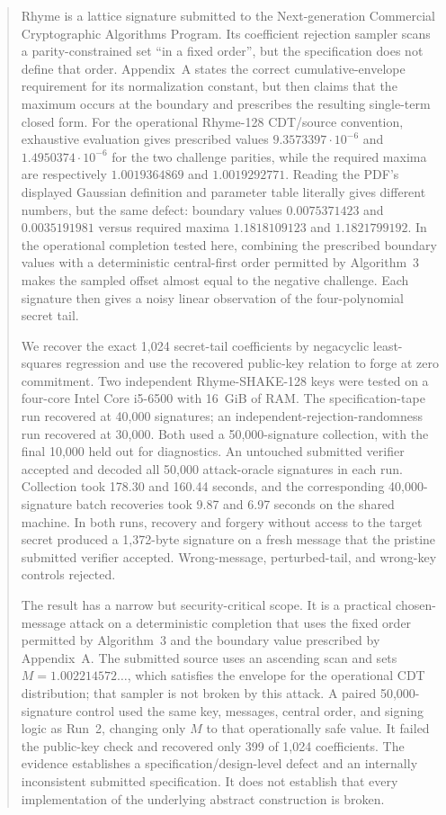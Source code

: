 \documentclass[11pt,a4paper]{article}
\begin{document}
\begin{abstract}
Rhyme is a lattice signature submitted to the Next-generation Commercial
Cryptographic Algorithms Program.  Its coefficient rejection sampler scans a
parity-constrained set ``in a fixed order'', but the specification does not
define that order.  Appendix~A states the correct cumulative-envelope
requirement for its normalization constant, but then claims that the maximum
occurs at the boundary and prescribes the resulting single-term closed form.
For the operational Rhyme-128 CDT/source convention, exhaustive evaluation
gives prescribed values $9.3573397\cdot10^{-6}$ and
$1.4950374\cdot10^{-6}$ for the two
challenge parities, while the required maxima are respectively
$1.0019364869$ and $1.0019292771$.  Reading the PDF's displayed Gaussian
definition and parameter table literally gives different numbers, but the
same defect: boundary values $0.0075371423$ and $0.0035191981$ versus required
maxima $1.1818109123$ and $1.1821799192$.  In the operational completion
tested here, combining the prescribed boundary values with a deterministic
central-first order permitted by Algorithm~3 makes the sampled offset almost
equal to the negative challenge.  Each signature then gives a noisy linear
observation of the four-polynomial secret tail.

We recover the exact 1,024 secret-tail coefficients by negacyclic
least-squares regression and use the recovered public-key relation to forge at
zero commitment.  Two independent Rhyme-SHAKE-128 keys were tested on a
four-core Intel Core i5-6500 with 16~GiB of RAM.  The specification-tape run
recovered at 40,000 signatures; an independent-rejection-randomness run
recovered at 30,000.  Both used a 50,000-signature collection, with the final
10,000 held out for diagnostics.  An untouched submitted verifier accepted
and decoded all 50,000 attack-oracle signatures in each run.  Collection took
178.30 and 160.44 seconds, and the corresponding 40,000-signature batch
recoveries took 9.87 and 6.97 seconds on the shared machine.  In both runs,
recovery and forgery without access to the target secret produced
a 1,372-byte signature on a fresh message that the pristine submitted
verifier accepted.  Wrong-message, perturbed-tail, and wrong-key controls
rejected.

The result has a narrow but security-critical scope.  It is a practical
chosen-message attack on a deterministic completion that uses the fixed order
permitted by Algorithm~3 and the boundary value prescribed by Appendix~A.
The submitted source uses an ascending scan and sets
$M=1.002214572\ldots$, which satisfies the envelope for the operational CDT
distribution; that sampler is not broken by this attack.  A paired
50,000-signature control used the same key, messages, central order, and
signing logic as Run~2, changing only $M$ to that operationally safe value.
It failed the public-key check and recovered only 399 of 1,024 coefficients.
The evidence establishes a specification/design-level defect and an
internally inconsistent submitted specification.  It does not establish that
every implementation of the underlying abstract construction is broken.
\end{abstract}
\end{document}
